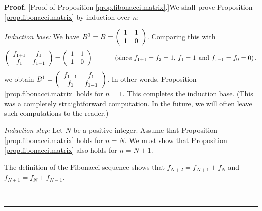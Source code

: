 \documentclass[numbers=enddot,12pt,final,onecolumn,notitlepage]{scrartcl}%
\theoremstyle{definition}
\newenvironment{proof}[1][Proof]{\noindent\textbf{#1.} }{\ \rule{0.5em}{0.5em}}
\begin{document}
\begin{proof}
[Proof of Proposition \ref{prop.fibonacci.matrix}.]We shall prove Proposition
\ref{prop.fibonacci.matrix} by induction over $n$:

\textit{Induction base:} We have $B^{1}=B=\left(
\begin{array}
[c]{cc}%
1 & 1\\
1 & 0
\end{array}
\right)  $. Comparing this with%
\[
\left(
\begin{array}
[c]{cc}%
f_{1+1} & f_{1}\\
f_{1} & f_{1-1}%
\end{array}
\right)  =\left(
\begin{array}
[c]{cc}%
1 & 1\\
1 & 0
\end{array}
\right)  \ \ \ \ \ \ \ \ \ \ \left(  \text{since }f_{1+1}=f_{2}=1\text{,
}f_{1}=1\text{ and }f_{1-1}=f_{0}=0\right)  ,
\]
we obtain $B^{1}=\left(
\begin{array}
[c]{cc}%
f_{1+1} & f_{1}\\
f_{1} & f_{1-1}%
\end{array}
\right)  $. In other words, Proposition \ref{prop.fibonacci.matrix} holds for
$n=1$. This completes the induction base. (This was a completely
straightforward computation. In the future, we will often leave such
computations to the reader.)

\textit{Induction step:} Let $N$ be a positive integer. Assume that
Proposition \ref{prop.fibonacci.matrix} holds for $n=N$. We must show that
Proposition \ref{prop.fibonacci.matrix} also holds for $n=N+1$.

The definition of the Fibonacci sequence shows that $f_{N+2}=f_{N+1}+f_{N}$
and $f_{N+1}=f_{N}+f_{N-1}$.


\end{proof}
\end{document}
